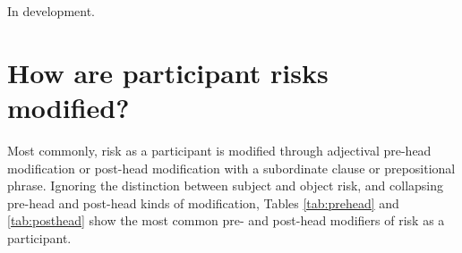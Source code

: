    \vspace{5mm}\noindent\begin{tcolorbox}[colback=yellow!5,colframe=yellow!40!black,title=Summary: processes involved when risk is a participant]
    \parbox{1\textwidth}{%
    In development.}
    \end{tcolorbox}
    \vspace{5mm}


\section{How are participant risks modified?} \FloatBarrier

    Most commonly, risk as a participant is modified through adjectival pre-head modification or post-head modification with a subordinate clause or prepositional phrase. Ignoring the distinction between subject and object risk, and collapsing pre-head and post-head kinds of modification, Tables \ref{tab:prehead} and \ref{tab:posthead} show the most common pre- and post-head modifiers of risk as a participant.


